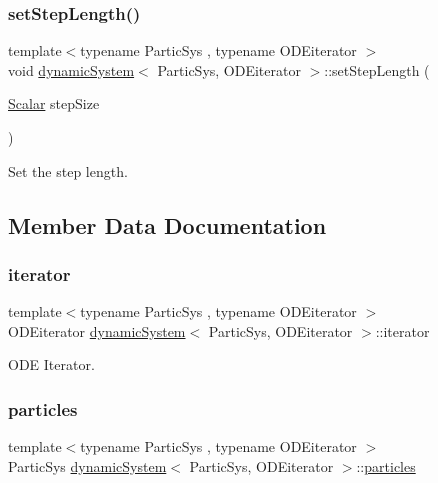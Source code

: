 \subsubsection{\texorpdfstring{set\+Step\+Length()}{setStepLength()}}
{\footnotesize\ttfamily template$<$typename Partic\+Sys , typename O\+D\+Eiterator $>$ \\
void \mbox{\hyperlink{classdynamic_system}{dynamic\+System}}$<$ Partic\+Sys, O\+D\+Eiterator $>$\+::set\+Step\+Length (\begin{DoxyParamCaption}\item[{\mbox{\hyperlink{classdynamic_system_a6eb7b06a4ee5721a1ee0855a854c3431}{Scalar}}}]{step\+Size }\end{DoxyParamCaption})}



Set the step length. 



\subsection{Member Data Documentation}
\mbox{\label{classdynamic_system_a0a13a11664ce5761ab4296b1b0421f99}} 
\subsubsection{\texorpdfstring{iterator}{iterator}}
{\footnotesize\ttfamily template$<$typename Partic\+Sys , typename O\+D\+Eiterator $>$ \\
O\+D\+Eiterator \mbox{\hyperlink{classdynamic_system}{dynamic\+System}}$<$ Partic\+Sys, O\+D\+Eiterator $>$\+::iterator}



O\+DE Iterator. 

\mbox{\label{classdynamic_system_a809657c0ef63741a7e3d6f32bc87bfe3}} 
\subsubsection{\texorpdfstring{particles}{particles}}
{\footnotesize\ttfamily template$<$typename Partic\+Sys , typename O\+D\+Eiterator $>$ \\
Partic\+Sys \mbox{\hyperlink{classdynamic_system}{dynamic\+System}}$<$ Partic\+Sys, O\+D\+Eiterator $>$\+::\mbox{\hyperlink{classparticles}{particles}}}



